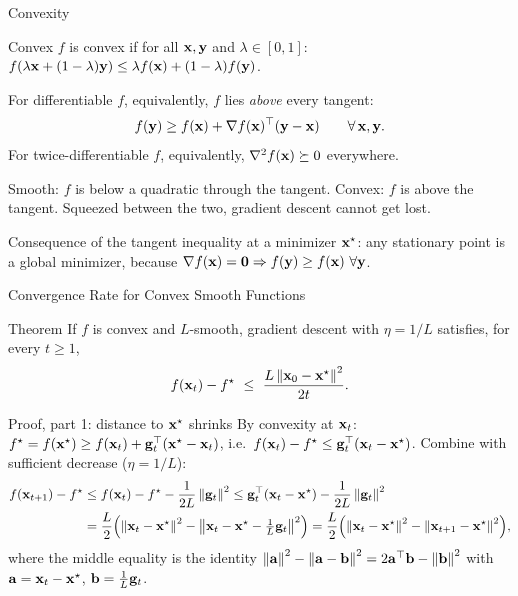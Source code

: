 \documentclass[11pt,aspectratio=169]{beamer}
\begin{document}
\begin{frame}{Convexity}
\begin{block}{Convex}
$f$ is convex if for all $\mathbf{x},\mathbf{y}$ and $\lambda\in[0,1]$: \ $f(\lambda\mathbf{x}+(1-\lambda)\mathbf{y})\le\lambda f(\mathbf{x})+(1-\lambda)f(\mathbf{y})$.
\end{block}
For differentiable $f$, equivalently, $f$ lies \emph{above} every tangent:
\[
f(\mathbf{y})\ge f(\mathbf{x})+\nabla f(\mathbf{x})^{\top}(\mathbf{y}-\mathbf{x})\qquad\forall\,\mathbf{x},\mathbf{y} .
\]
For twice-differentiable $f$, equivalently, $\nabla^2f(\mathbf{x})\succeq0$ everywhere.
\vspace{4pt}
\begin{keypoint}
Smooth: $f$ is below a quadratic through the tangent. Convex: $f$ is above the tangent.
Squeezed between the two, gradient descent cannot get lost.
\end{keypoint}
Consequence of the tangent inequality at a minimizer $\mathbf{x}^\star$: any stationary point is a global minimizer,
because $\nabla f(\mathbf{x})=\mathbf{0}\Rightarrow f(\mathbf{y})\ge f(\mathbf{x})\ \forall\mathbf{y}$.
\end{frame}

\begin{frame}{Convergence Rate for Convex Smooth Functions}\small
\begin{claim}{Theorem}
If $f$ is convex and $L$-smooth, gradient descent with $\eta=1/L$ satisfies, for every $t\ge1$,
\[
f(\vx_t)-f^\star\ \le\ \frac{L\norm{\vx_0-\vx^\star}^2}{2t}.
\]
\end{claim}
\begin{derivation}{Proof, part 1: distance to $\mathbf{x}^\star$ shrinks}
By convexity at $\mathbf{x}_t$: $f^\star=f(\mathbf{x}^\star)\ge f(\mathbf{x}_t)+\mathbf{g}_t^{\top}(\mathbf{x}^\star-\mathbf{x}_t)$, i.e.\
$f(\mathbf{x}_t)-f^\star\le\mathbf{g}_t^{\top}(\mathbf{x}_t-\mathbf{x}^\star)$. Combine with sufficient decrease ($\eta=1/L$):
\begin{align*}
f(\mathbf{x}_{t+1})-f^\star&\le f(\mathbf{x}_t)-f^\star-\frac{1}{2L}\left\lVert \mathbf{g}_t \right\rVert^2
\le\mathbf{g}_t^{\top}(\mathbf{x}_t-\mathbf{x}^\star)-\frac1{2L}\left\lVert \mathbf{g}_t \right\rVert^2\\
&=\frac L2\Bigl(\left\lVert \mathbf{x}_t-\mathbf{x}^\star \right\rVert^2-\left\lVert \mathbf{x}_t-\mathbf{x}^\star-\tfrac1L\mathbf{g}_t \right\rVert^2\Bigr)
=\frac L2\Bigl(\left\lVert \mathbf{x}_t-\mathbf{x}^\star \right\rVert^2-\left\lVert \mathbf{x}_{t+1}-\mathbf{x}^\star \right\rVert^2\Bigr),
\end{align*}
where the middle equality is the identity $\left\lVert \mathbf{a} \right\rVert^2-\left\lVert \mathbf{a}-\mathbf{b} \right\rVert^2=2\mathbf{a}^{\top}\mathbf{b}-\left\lVert \mathbf{b} \right\rVert^2$
with $\mathbf{a}=\mathbf{x}_t-\mathbf{x}^\star$, $\mathbf{b}=\tfrac1L\mathbf{g}_t$.
\end{derivation}
\end{frame}
\end{document}
